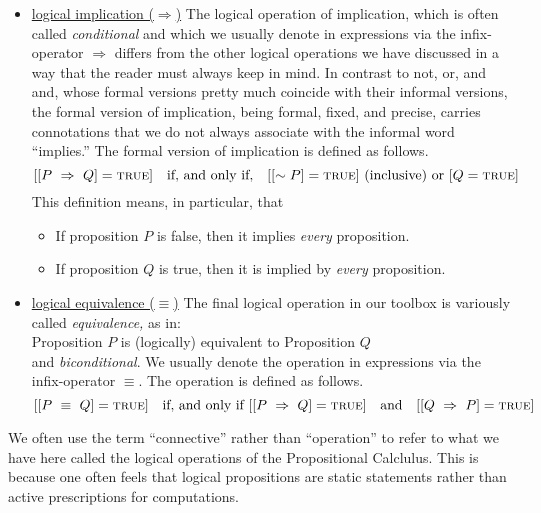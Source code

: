 \begin{itemize}
\item
\underline{logical implication ($\Rightarrow$)}
%
The logical operation of implication, which is often called {\it
  conditional} and which we usually denote in expressions via the
infix-operator $\Rightarrow$ differs from the other logical operations
we have discussed in a way that the reader must always keep in mind.
In contrast to {\small\sf not}, {\small\sf or}, and {\small\sf and},
whose formal versions pretty much coincide with their informal
versions, the formal version of implication, being formal, fixed, and
precise, carries connotations that we do not always associate with the
informal word ``implies.''  The formal version of implication is
defined as follows.
\[ [[P \ \Rightarrow \ Q] = \mbox{\sc true}]  \ \ \mbox{ if, and only
  if, } \ \
  [ [\sim P] = \mbox{\sc true}] \mbox{ (inclusive) or } [Q = \mbox{\sc true}]
\]
This definition means, in particular, that
  \begin{itemize}
  \item
If proposition $P$  is false, then it implies {\em every} proposition.
  \item
If proposition $Q$ is true, then it is implied by {\em every} proposition.
  \end{itemize}

\item
\underline{logical equivalence ($\equiv$)}
%
The final logical operation in our toolbox is variously called {\it
  equivalence,} as in: \\
\hspace*{.35in}Proposition $P$ is (logically) equivalent to
Proposition $Q$ \\
and {\it biconditional}.  We usually denote the operation in
expressions via the infix-operator $\equiv$.  The operation is defined
as follows.
\[ 
[[P \ \equiv \ Q] = \mbox{\sc true}]  \ \ \mbox{ if, and only if }
[[P \ \Rightarrow \ Q] = \mbox{\sc true}]  \ \ \mbox{ and } \ \
[[Q \ \Rightarrow \ P] = \mbox{\sc true}]
\]
\end{itemize}

We often use the term ``connective'' rather than ``operation'' to
refer to what we have here called the logical operations of the
Propositional Calclulus.  This is because one often feels that logical
propositions are static statements rather than active prescriptions
for computations.


